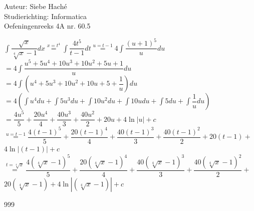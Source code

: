 \documentclass[a4paper]{article}
\begin{document}
  
\noindent \large Auteur: Siebe Haché \\
\noindent \large Studierichting: Informatica\\
\noindent \large Oefeningenreeks 4A nr. 60.5\\

\medskip

\normalsize

$ \displaystyle\int \dfrac{\sqrt{x}}{\sqrt[4]{x}- 1} dx \stackrel{x= t^4}{=} \displaystyle\int \dfrac{4t^5}{t - 1} dt
\stackrel{u = t - 1}{=} 4\displaystyle\int \dfrac{(u + 1)^5}{u}du $\\

$ = 4 \displaystyle\int \dfrac{u^5 + 5u^4 + 10u^3 + 10u^2 + 5u + 1}{u} du $\\							

$ = 4 \displaystyle\int \left( u^4 + 5u^3 + 10u^2 + 10u + 5 + \dfrac{1}{u} \right) du $\\

$ =  4 \left(\displaystyle\int u^4 du +  \displaystyle\int 5u^3 du +  \displaystyle\int 10u^2 du +  \displaystyle\int 10u du +  \displaystyle\int 5 du +  \displaystyle\int \dfrac{1}{u} du\right) $\\

$ = \dfrac{4u^5}{5} + \dfrac{20u^4}{4} + \dfrac{40u^3}{3}+ \dfrac{40u^2}{2} + 20u + 4\ln| u | + c $\\

$  \stackrel{u = t - 1}{=} \dfrac{4 \left(t - 1\right)^5}{5} + \dfrac{20 \left(t - 1\right)^4}{4} + \dfrac{40 \left(t - 1\right)^3}{3}+ \dfrac{40 \left(t - 1\right)^2}{2} + 20\left(t - 1\right) + $\\

$ 4\ln| (t - 1) | + c $\\

$  \stackrel{t = \sqrt[4]{x}}{=} \dfrac{4\left(\sqrt[4]{x} - 1\right)^5}{5} + \dfrac{20 \left(\sqrt[4]{x}- 1\right)^4}{4} + \dfrac{40 \left(\sqrt[4]{x} - 1\right)^3}{3}+ \dfrac{40 \left(\sqrt[4]{x} - 1\right)^2}{2} + $\\ 

$ 20 \left(\sqrt[4]{x} - 1\right) + 4\ln|  \left(\sqrt[4]{x} - 1\right) | + c $\\

\begin{thebibliography}{999}
\end{thebibliography}
\end{document}

